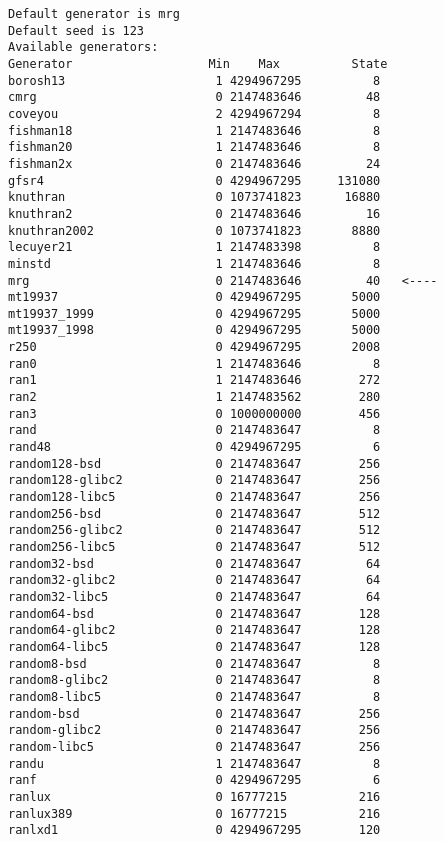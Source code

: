 \documentclass[letterpaper,12pt]{article}
\begin{document}
{\small
\begin{verbatim}
Default generator is mrg
Default seed is 123
Available generators:
Generator                   Min    Max          State
borosh13                     1 4294967295          8
cmrg                         0 2147483646         48
coveyou                      2 4294967294          8
fishman18                    1 2147483646          8
fishman20                    1 2147483646          8
fishman2x                    0 2147483646         24
gfsr4                        0 4294967295     131080
knuthran                     0 1073741823      16880
knuthran2                    0 2147483646         16
knuthran2002                 0 1073741823       8880
lecuyer21                    1 2147483398          8
minstd                       1 2147483646          8
mrg                          0 2147483646         40   <----
mt19937                      0 4294967295       5000
mt19937_1999                 0 4294967295       5000
mt19937_1998                 0 4294967295       5000
r250                         0 4294967295       2008
ran0                         1 2147483646          8
ran1                         1 2147483646        272
ran2                         1 2147483562        280
ran3                         0 1000000000        456
rand                         0 2147483647          8
rand48                       0 4294967295          6
random128-bsd                0 2147483647        256
random128-glibc2             0 2147483647        256
random128-libc5              0 2147483647        256
random256-bsd                0 2147483647        512
random256-glibc2             0 2147483647        512
random256-libc5              0 2147483647        512
random32-bsd                 0 2147483647         64
random32-glibc2              0 2147483647         64
random32-libc5               0 2147483647         64
random64-bsd                 0 2147483647        128
random64-glibc2              0 2147483647        128
random64-libc5               0 2147483647        128
random8-bsd                  0 2147483647          8
random8-glibc2               0 2147483647          8
random8-libc5                0 2147483647          8
random-bsd                   0 2147483647        256
random-glibc2                0 2147483647        256
random-libc5                 0 2147483647        256
randu                        1 2147483647          8
ranf                         0 4294967295          6
ranlux                       0 16777215          216
ranlux389                    0 16777215          216
ranlxd1                      0 4294967295        120

\end{verbatim}}
\end{document}
